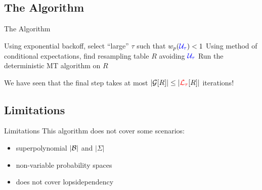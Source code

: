 \documentclass{beamer}
\def\spadding{\vspace{0.25cm}}
\def\r{\textcolor{red}}
\begin{document}
\subsection{The Algorithm}
\begin{frame}{The Algorithm}

\begin{algorithm}[H]
\pause
Using exponential backoff, select ``large'' $\tau$ such that $w_p(\textcolor{blue}{\mathcal{U}_\tau}) < 1$\;\pause
Using method of conditional expectations, find resampling table $R$ avoiding $\textcolor{blue}{\mathcal{U}_\tau}$\;\pause
Run the deterministic MT algorithm on $R$\;
\end{algorithm}\pause\spadding

We have seen that the final step takes at most $|\compat{\G}{R}| \leq |\compat{\L}{R}|$ iterations!
\end{frame}

\subsection{Limitations}
\begin{frame}{Limitations}
This algorithm does not cover some scenarios:
\begin{itemize}
    \item superpolynomial $|\mathcal{B}|$ and $|\Sigma|$\pause
    \item non-variable probability spaces\pause
    \item does not cover lopsidependency
\end{itemize}
\end{frame}

    
    
\end{document}
